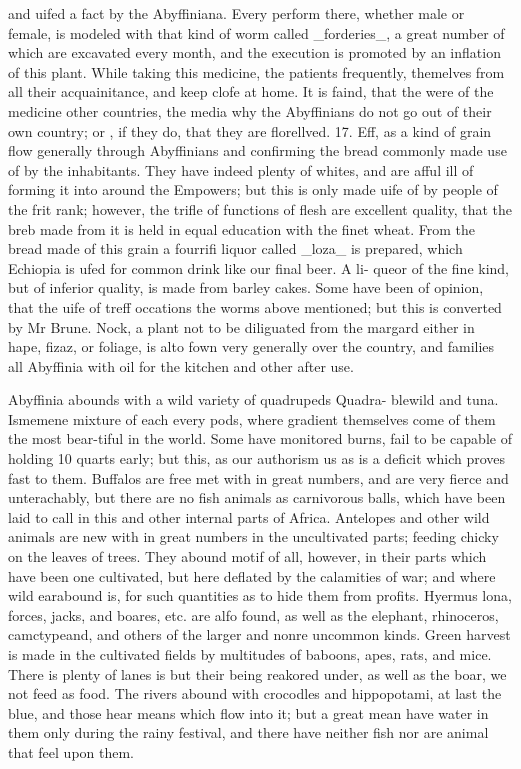 \documentclass{article}
\begin{document}
and uifed a fact by the Abyffiniana. Every perform there, whether male or female, is modeled with that kind of worm called \_forderies\_, a great number of which are excavated every month, and the execution is promoted by an inflation of this plant. While taking this medicine, the patients frequently, themelves from all their acquainitance, and keep clofe at home. It is faind, that the were of the medicine other countries, the media why the Abyffinians do not go out of their own country; or , if they do, that they are florellved. 17. Eff, as a kind of grain flow generally through Abyffinians and confirming the bread commonly made use of by the inhabitants. They have indeed plenty of whites, and are afful ill of forming it into around the Empowers; but this is only made uife of by people of the frit rank; however, the trifle of functions of flesh are excellent quality, that the breb made from it is held in equal education with the finet wheat. From the bread made of this grain a fourrifi liquor called \_loza\_ is prepared, which Echiopia is ufed for common drink like our final beer. A li- queor of the fine kind, but of inferior quality, is made from barley cakes. Some have been of opinion, that the uife of treff occations the worms above mentioned; but this is converted by Mr Brune. Nock, a plant not to be diliguated from the margard either in hape, fizaz, or foliage, is alto fown very generally over the country, and families all Abyffinia with oil for the kitchen and other after use.

Abyffinia abounds with a wild variety of quadrupeds Quadra- blewild and tuna. Ismemene mixture of each every pods, where gradient themselves come of them the most bear-tiful in the world. Some have monitored burns, fail to be capable of holding 10 quarts early; but this, as our authorism us as is a deficit which proves fast to them. Buffalos are free met with in great numbers, and are very fierce and unterachably, but there are no fish animals as carnivorous balls, which have been laid to call in this and other internal parts of Africa. Antelopes and other wild animals are new with in great numbers in the uncultivated parts; feeding chicky on the leaves of trees. They abound motif of all, however, in their parts which have been one cultivated, but here deflated by the calamities of war; and where wild earabound is, for such quantities as to hide them from profits. Hyermus lona, forces, jacks, and boares, etc. are alfo found, as well as the elephant, rhinoceros, camctypeand, and others of the larger and nonre uncommon kinds. Green harvest is made in the cultivated fields by multitudes of baboons, apes, rats, and mice. There is plenty of lanes is but their being reakored under, as well as the boar, we not feed as food. The rivers abound with crocodles and hippopotami, at last the blue, and those hear means which flow into it; but a great mean have water in them only during the rainy festival, and there have neither fish nor are animal that feel upon them.
\end{document}
